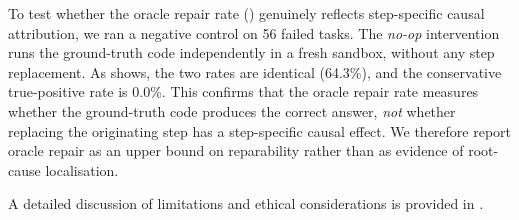 To test whether the oracle repair rate () genuinely reflects step-specific causal attribution, we ran a negative control on 56 failed tasks. The \emph{no-op} intervention runs the ground-truth code independently in a fresh sandbox, without any step replacement. As  shows, the two rates are identical (64.3\%), and the conservative true-positive rate is 0.0\%. This confirms that the oracle repair rate measures whether the ground-truth code produces the correct answer, \emph{not} whether replacing the originating step has a step-specific causal effect. We therefore report oracle repair as an upper bound on reparability rather than as evidence of root-cause localisation.



A detailed discussion of limitations and ethical considerations is provided in .

